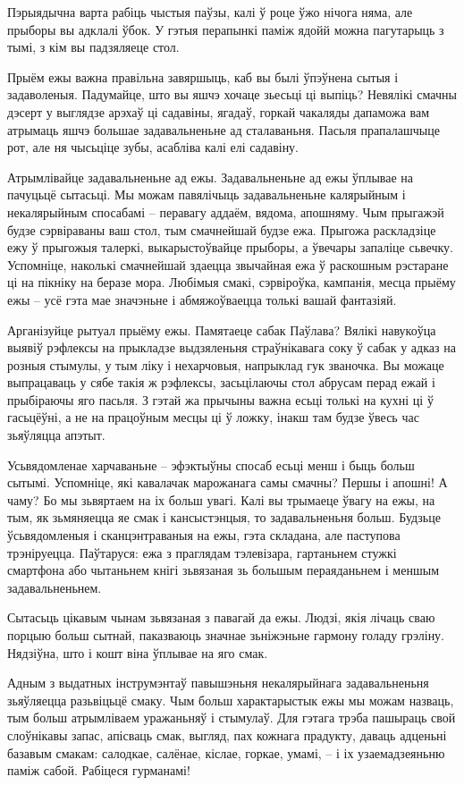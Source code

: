 Пэрыядычна варта рабіць чыстыя паўзы, калі ў роце ўжо нічога няма, але прыборы вы адклалі ўбок. У гэтыя перапынкі паміж ядойй можна пагутарыць з тымі, з кім вы падзяляеце стол.

Прыём ежы важна правільна завяршыць, каб вы былі ўпэўнена сытыя і задаволеныя. Падумайце, што вы яшчэ хочаце зьесьці ці выпіць? Невялікі смачны дэсерт у выглядзе арэхаў ці садавіны, ягадаў, горкай чакаляды дапаможа вам атрымаць яшчэ большае задавальненьне ад сталаваньня. Пасьля прапалашчыце рот, але ня чысьціце зубы, асабліва калі елі садавіну.

Атрымлівайце задавальненьне ад ежы. Задавальненьне ад ежы ўплывае на пачуцьцё сытасьці. Мы можам павялічыць задавальненьне калярыйным і некалярыйным спосабамі – перавагу аддаём, вядома, апошняму. Чым прыгажэй будзе сэрвіраваны ваш стол, тым смачнейшай будзе ежа. Прыгожа раскладзіце ежу ў прыгожыя талеркі, выкарыстоўвайце прыборы, а ўвечары запаліце сьвечку. Успомніце, наколькі смачнейшай здаецца звычайная ежа ў раскошным рэстаране ці на пікніку на беразе мора. Любімыя смакі, сэрвіроўка, кампанія, месца прыёму ежы – усё гэта мае значэньне і абмяжоўваецца толькі вашай фантазіяй.

Арганізуйце рытуал прыёму ежы. Памятаеце сабак Паўлава? Вялікі навукоўца выявіў рэфлексы на прыкладзе выдзяленьня страўнікавага соку ў сабак у адказ на розныя стымулы, у тым ліку і нехарчовыя, напрыклад гук званочка. Вы можаце выпрацаваць у сябе такія ж рэфлексы, засьцілаючы стол абрусам перад ежай і прыбіраючы яго пасьля. З гэтай жа прычыны важна есьці толькі на кухні ці ў гасьцёўні, а не на працоўным месцы ці ў ложку, інакш там будзе ўвесь час зьяўляцца апэтыт.

Усьвядомленае харчаваньне – эфэктыўны спосаб есьці менш і быць больш сытымі. Успомніце, які кавалачак марожанага самы смачны? Першы і апошні! А чаму? Бо мы зьвяртаем на іх больш увагі. Калі вы трымаеце ўвагу на ежы, на тым, як зьмяняецца яе смак і кансыстэнцыя, то задавальненьня больш. Будзьце ўсьвядомленыя і сканцэнтраваныя на ежы, гэта складана, але паступова трэніруецца. Паўтаруся: ежа з праглядам тэлевізара, гартаньнем стужкі смартфона або чытаньнем кнігі зьвязаная зь большым пераяданьнем і меншым задавальненьнем.

Сытасьць цікавым чынам зьвязаная з павагай да ежы. Людзі, якія лічаць сваю порцыю больш сытнай, паказваюць значнае зьніжэньне гармону голаду грэліну. Нядзіўна, што і кошт віна ўплывае на яго смак.

Адным з выдатных інструмэнтаў павышэньня некалярыйнага задавальненьня зьяўляецца разьвіцьцё смаку. Чым больш характарыстык ежы мы можам назваць, тым больш атрымліваем уражаньняў і стымулаў. Для гэтага трэба пашыраць свой слоўнікавы запас, апісваць смак, выгляд, пах кожнага прадукту, даваць адценьні базавым смакам: салодкае, салёнае, кіслае, горкае, умамі, – і іх узаемадзеяньню паміж сабой. Рабіцеся гурманамі!

